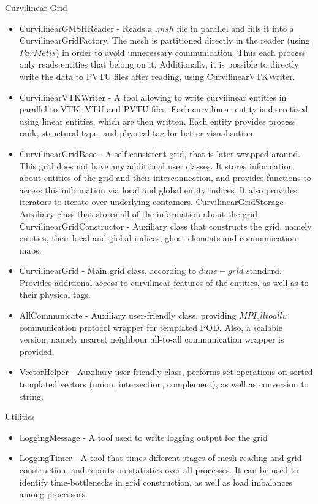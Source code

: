 Curvilinear Grid
\begin{itemize}
	\item CurvilinearGMSHReader - Reads a $.msh$ file in parallel and fills it into a CurvilinearGridFactory. The mesh is partitioned directly in the reader (using $ParMetis$) in order to avoid unnecessary communication. Thus each process only reads entities that belong on it. Additionally, it is possible to directly write the data to PVTU files after reading, using CurvilinearVTKWriter.
	\item CurvilinearVTKWriter - A tool allowing to write curvilinear entities in parallel to VTK, VTU and PVTU files. Each curvilinear entity is discretized using linear entities, which are then written. Each entity provides process rank, structural type, and physical tag for better visualisation.
	\item CurvilinearGridBase - A self-consistent grid, that is later wrapped around. This grid does not have any additional user classes. It stores information about entities of the grid and their interconnection, and provides functions to access this information via local and global entity indices. It also provides iterators to iterate over underlying containers.
		\subitem CurvilinearGridStorage - Auxiliary class that stores all of the information about the grid
		\subitem CurvilinearGridConstructor - Auxiliary class that constructs the grid, namely entities, their local and global indices, ghost elements and communication maps.
	\item CurvilinearGrid - Main grid class, according to $dune-grid$ standard. Provides additional access to curvilinear features of the entities, as well as to their physical tags.
	\item AllCommunicate - Auxiliary user-friendly class, providing $MPI_alltoallv$ communication protocol wrapper for templated POD. Also, a scalable version, namely nearest neighbour all-to-all communication wrapper is provided.
	\item VectorHelper - Auxiliary user-friendly class, performs set operations on sorted templated vectors (union, intersection, complement), as well as conversion to string.
\end{itemize}

Utilities
\begin{itemize}
	\item LoggingMessage - A tool used to write logging output for the grid
	\item LoggingTimer - A tool that times different stages of mesh reading and grid construction, and reports on statistics over all processes. It can be used to identify time-bottlenecks in grid construction, as well as load imbalances among processors.
\end{itemize}
